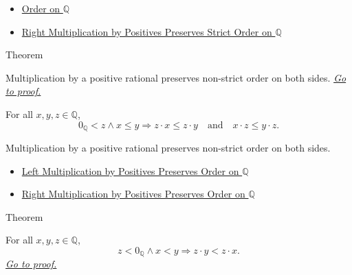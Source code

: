 \begin{dependencies}
\begin{itemize}
  \item \hyperref[def:order-on-q]{Order on $\mathbb{Q}$}
  \item \hyperref[cor:right-positive-multiplication-preserves-strict-order-on-q]{Right Multiplication by Positives Preserves Strict Order on $\mathbb{Q}$}
\end{itemize}
\end{dependencies}

\begin{theorembox}{Theorem}
\begin{theorem}
\label{thm:positive-multiplication-preserves-order-on-q}
Multiplication by a positive rational preserves non-strict order on both sides.
\hyperref[prf:positive-multiplication-preserves-order-on-q]{\textit{Go to proof.}}
\end{theorem}
\end{theorembox}

\begin{remark*}
For all $x,y,z\in\mathbb{Q}$,
\[
0_{\mathbb{Q}}<z\land x\le y
\Longrightarrow
z\cdot x\le z\cdot y
\quad\text{and}\quad
x\cdot z\le y\cdot z.
\]
\end{remark*}

\begin{remark*}[Interpretation]
Multiplication by a positive rational preserves non-strict order on both
sides.
\end{remark*}

\begin{dependencies}
\begin{itemize}
  \item \hyperref[thm:left-positive-multiplication-preserves-order-on-q]{Left Multiplication by Positives Preserves Order on $\mathbb{Q}$}
  \item \hyperref[cor:right-positive-multiplication-preserves-order-on-q]{Right Multiplication by Positives Preserves Order on $\mathbb{Q}$}
\end{itemize}
\end{dependencies}

\begin{theorembox}{Theorem}
\begin{theorem}
\label{thm:negative-multiplication-reverses-strict-order-on-q}
For all $x,y,z\in\mathbb{Q}$,
\[
z<0_{\mathbb{Q}}\land x<y
\Longrightarrow
z\cdot y<z\cdot x.
\]
\hyperref[prf:negative-multiplication-reverses-strict-order-on-q]{\textit{Go to proof.}}
\end{theorem}
\end{theorembox}

